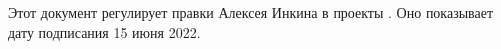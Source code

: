 
Этот документ регулирует правки Алексея Инкина в проекты \Asf.
Оно показывает дату подписания 15 июня 2022.


